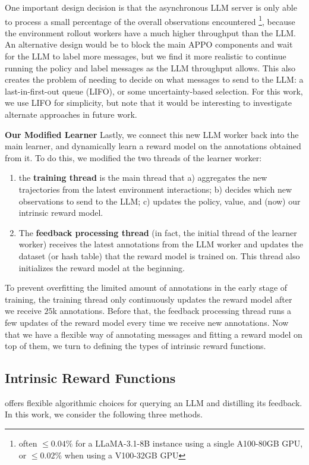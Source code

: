 One important design decision is that the asynchronous LLM server is only able to
process a small percentage of the overall observations encountered \footnote{often $\leq 0.04\%$
for a LLaMA-3.1-8B instance using a single A100-80GB GPU, or $\leq 0.02\%$ when using a V100-32GB GPU},
because the environment rollout workers have a much higher throughput than the LLM.
An alternative design would be to block the main APPO components and wait
for the LLM to label more messages, but we find it more realistic to continue
running the policy and label messages as the LLM throughput allows.
This also creates the problem of needing to decide on what messages to
send to the LLM: a last-in-first-out queue (LIFO), or some uncertainty-based selection.
For this work, we use LIFO for simplicity, but note that it would be interesting to investigate alternate approaches in future work.
%

\textbf{Our Modified Learner}
Lastly, we connect this new LLM worker back into the main learner,
and dynamically learn a reward model on the annotations obtained from it.
To do this, we modified the two threads of the learner worker:
\begin{enumerate}[itemsep=0pt, topsep=0pt]
\item the \textbf{training thread} is the main thread that
a) aggregates the new trajectories from the latest environment interactions;
b) decides which new observations to send to the LLM;
c) updates the policy, value, and (now) our intrinsic reward model.
%
\item The \textbf{feedback processing thread} (in fact, the initial thread of the learner worker) receives the latest
  annotations from the LLM worker and updates the dataset (or hash table)
  that the reward model is trained on.
  This thread also initializes the reward model at the beginning. 
\end{enumerate}
%
To prevent overfitting the limited amount of annotations in the early stage of training,
the training thread only continuously updates the reward model after we receive $25$k annotations. 
Before that, the feedback processing thread runs a few updates of the reward model every time we receive new annotations.
%
Now that we have a flexible way of annotating messages and fitting a reward
model on top of them, we turn to defining the types of intrinsic reward functions.

\subsection{Intrinsic Reward Functions}
\label{sec:methods}
\oni offers flexible algorithmic choices for querying an LLM and distilling its feedback. In this work, we consider the following
three methods.

